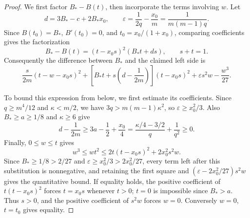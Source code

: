 \documentclass[10pt]{article}
\numberwithin{equation}{section}
\theoremstyle{definition}
\begin{document}
\begin{proof}
We first factor $B_*-B(t)$, then incorporate the terms involving $w$. Let
\[
 d=3B_*-c+2B_*x_0,\qquad
 \varepsilon=\frac1{2q}-\frac{x_0}{m}
             =\frac1{m(m-1)q}.
\]
Since $B(t_0)=B_*$, $B'(t_0)=0$, and $t_0=x_0/(1+x_0)$, comparing coefficients gives the factorization
\[
 B_*-B(t)=(t-x_0s)^2(B_*t+ds),\qquad s+t=1.
\]
Consequently the difference between $B_*$ and the claimed left side is
\[
 \frac{s}{2m}(t-w-x_0s)^2
 +\left[B_*t+s\left(d-\frac1{2m}\right)\right](t-x_0s)^2
 +\varepsilon s^2w-\frac{w^3}{27}.
\]

To bound this expression from below, we first estimate its coefficients. Since $q\ge m^4/12$ and $\kappa<m/2$, we have $3q>m(m-1)\kappa^2$, so $\varepsilon\ge x_0^2/3$. Also $B_*\ge a\ge1/8$ and $\kappa\ge6$ give
\[
 d-\frac1{2m}\ge3a-\frac12+\frac{x_0}{4}
 =\frac{\kappa/4-3/2}{q}+\frac1{q^2}\ge0.
\]
Finally, $0\le w\le t$ gives
\[
 w^3\le wt^2
 \le2t(t-x_0s)^2+2x_0^2s^2w.
\]
Since $B_*\ge1/8>2/27$ and $\varepsilon\ge x_0^2/3>2x_0^2/27$, every term left after this substitution is nonnegative, and retaining the first square and $(\varepsilon-2x_0^2/27)s^2w$ gives the quantitative bound. If equality holds, the positive coefficient of $t(t-x_0s)^2$ forces $t=x_0s$ whenever $t>0$; $t=0$ is impossible since $B_*>a$. Thus $s>0$, and the positive coefficient of $s^2w$ forces $w=0$. Conversely $w=0$, $t=t_0$ gives equality.
\end{proof}
\end{document}
